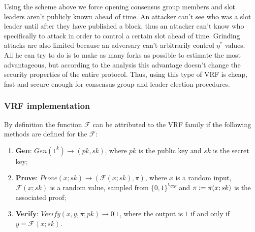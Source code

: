 Using the scheme above we force opening consensus group members and slot leaders aren't publicly known ahead of time.
An attacker can't see who was a slot leader until after they have published a block, thus an attacker can't know who specifically to attack in order to control a certain slot ahead of time.
Grinding attacks are also limited because an adversary can't arbitrarily control $\eta^*$ values.
All he can try to do is to make as many forks as possible to estimate the most advantageous, but according to the analysis this advantage doesn't change the security properties of the entire protocol.
Thus, using this type of VRF is cheap, fast and secure enough for consensus group and leader election procedures.

\subsubsection{VRF implementation}

By definition the function $\mathcal{F}$ can be attributed to the VRF family if the following methods are defined for the $\mathcal{F}$:
\begin{enumerate}
    \item \textbf{Gen}: ${Gen(1^k) \rightarrow (pk, sk)}$, where $pk$ is the public key and $sk$ is the secret key;
    \item \textbf{Prove}: ${Prove(x; sk) \rightarrow (\mathcal{F}(x; sk), \pi)}$, where $x$ is a random input, $\mathcal{F}(x; sk)$ is a random value, sampled from $\{0,1\}^{l_{VRF}}$ and $\pi \vcentcolon= \pi(x; sk)$ is the associated proof;
    \item \textbf{Verify}: ${Verify(x, y, \pi; pk) \rightarrow 0 | 1}$, where the output is $1$ if and only if ${y=\mathcal{F}(x; sk)}$.
\end{enumerate}

